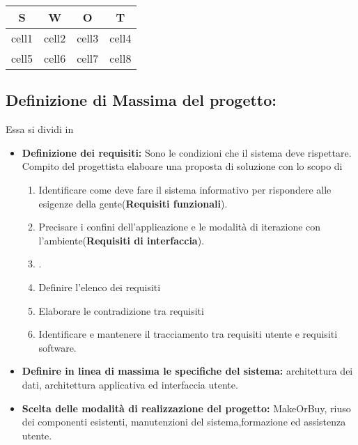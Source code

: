 \documentclass{report}
\begin{document}
\begin{center}
\begin{tabular}{ |c|c|c|c| } 
 \hline
 S & W & O & T \\ [0.5ex] 
 \hline\hline
 cell1 & cell2 & cell3 & cell4 \\
 cell5 & cell6 & cell7 & cell8 \\
 \hline
\end{tabular}
\end{center}



\subsection{Definizione di Massima del progetto:}
Essa si dividi in
\begin{itemize}
    \item \textbf{Definizione dei requisiti:} Sono le condizioni che il sistema deve rispettare. 		Compito del progettista elaboare una proposta di soluzione con lo scopo di
    \begin{enumerate}
        \item Identificare come deve fare il sistema informativo per rispondere alle esigenze della gente(\textbf{Requisiti funzionali}).
        \item Precisare i confini dell'applicazione e le modalità di iterazione con l'ambiente(\textbf{Requisiti di interfaccia}).
        \item .
        \item Definire l'elenco dei requisiti
        \item Elaborare le contradizione tra requisiti
        \item Identificare e mantenere il tracciamento tra requisiti utente e requisiti software.
    \end{enumerate}
    \item \textbf{Definire in linea di massima le specifiche del sistema:} architettura dei dati, architettura applicativa ed interfaccia utente.
    \item \textbf{Scelta delle modalità di realizzazione del progetto:} MakeOrBuy, riuso dei componenti esistenti, manutenzioni del sistema,formazione ed assistenza utente.
\end{itemize}
\end{document}
